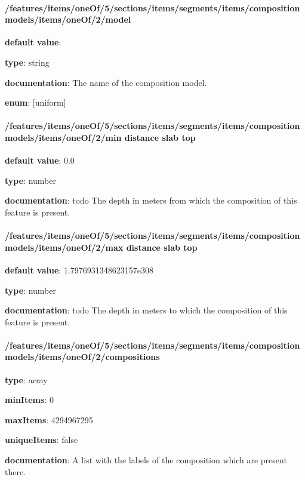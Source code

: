 \paragraph{/features/items/oneOf/5/sections/items/segments/items/composition models/items/oneOf/2/model} \begin{itemized}
\item {\bf default value}: 
\item {\bf type}: string
\item {\bf documentation}: The name of the composition model.
\item {\bf enum}: [uniform]\end{itemized}\paragraph{/features/items/oneOf/5/sections/items/segments/items/composition models/items/oneOf/2/min distance slab top} \begin{itemized}
\item {\bf default value}: 0.0
\item {\bf type}: number
\item {\bf documentation}: todo The depth in meters from which the composition of this feature is present.
\end{itemized}\paragraph{/features/items/oneOf/5/sections/items/segments/items/composition models/items/oneOf/2/max distance slab top} \begin{itemized}
\item {\bf default value}: 1.7976931348623157e308
\item {\bf type}: number
\item {\bf documentation}: todo The depth in meters to which the composition of this feature is present.
\end{itemized}\paragraph{/features/items/oneOf/5/sections/items/segments/items/composition models/items/oneOf/2/compositions} \begin{itemized}
\item {\bf type}: array
\item {\bf minItems}: 0
\item {\bf maxItems}: 4294967295
\item {\bf uniqueItems}: false
\item {\bf documentation}: A list with the labels of the composition which are present there.

\end{itemized}
